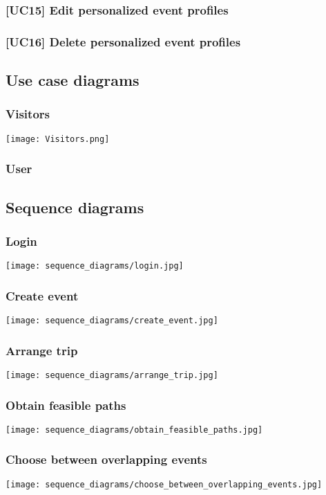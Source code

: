 	\subsubsection{[UC15] Edit personalized event profiles}
	
		
	\subsubsection{[UC16] Delete personalized event profiles}
	
		
\subsection{Use case diagrams}
\label{subsect:Use case diagrams}
	\subsubsection{Visitors}
		\texttt{[image: Visitors.png]}
	\subsubsection{User}
		\noindent{}
		
\subsection{Sequence diagrams}
\label{subsect:Sequence diagrams}
	\subsubsection{Login}
		\texttt{[image: sequence\_diagrams/login.jpg]}
	\subsubsection{Create event}
		\texttt{[image: sequence\_diagrams/create\_event.jpg]}
	\subsubsection{Arrange trip}
		\texttt{[image: sequence\_diagrams/arrange\_trip.jpg]}
	\subsubsection{Obtain feasible paths}
		\texttt{[image: sequence\_diagrams/obtain\_feasible\_paths.jpg]}
	\subsubsection{Choose between overlapping events}
		\texttt{[image: sequence\_diagrams/choose\_between\_overlapping\_events.jpg]}
